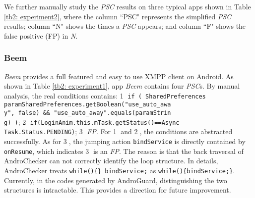 We further manually study the \textit{PSC} results on three typical apps shown in Table \ref{tb2: experiment2}, where the column ``PSC" represents the simplified \textit{PSC} results; column ``N" shows the times a \textit{PSC} appears;  
and column ``F" shows the false positive (FP) in \textit{N}. 

\subsubsection{Beem}
\textit{Beem} provides a full featured and easy to use XMPP client on Android. As shown in Table \ref{tb2: experiment1}, app \textit{Beem} contains four \textit{PSC}s.
By manual analysis, the real conditions contains: \textcircled{1} \texttt{if ( SharedPreferences paramSharedPreferences.getBoolean("use\_auto\_awa}  \\
\texttt{y", false) \&\& "use\_auto\_away".equals(paramStrin}\\
\texttt{g) )}; \textcircled{2} \texttt{if(LoginAnim.this.mTask.getStatus()==Async}\\
\texttt{Task.Status.PENDING)}; \textcircled{3} \textit{FP}. For \textcircled{1} and \textcircled{2}, the conditions are abstracted successfully. As for \textcircled{3}, the jumping action \texttt{bindService} is directly contained by \texttt{onResume}, which indicates \textcircled{3} is an \textit{FP}. The reason is that the back traversal of AndroChecker can not correctly identify the loop structure. In details, AndroChecker treats \texttt{while()\{\} bindService;} as \texttt{while()\{bindService;\}}. Currently, in the codes generated by AndroGuard, distinguishing the two structures is intractable. This provides a direction for future improvement.


